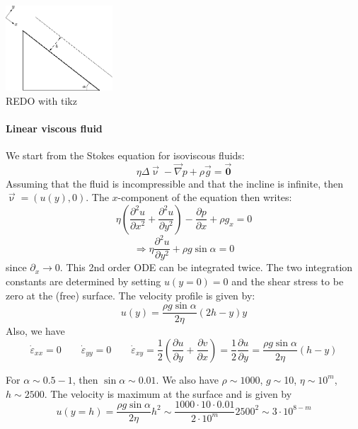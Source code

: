 

\begin{center}
\includegraphics[width=4cm]{python_codes/fieldstone_59/images/setup}\\
{\captionfont REDO with tikz}
\end{center}

\paragraph{Linear viscous fluid}

We start from the Stokes equation for isoviscous fluids:
\[
\eta \Delta \vec{\upnu} - \vec\nabla p + \rho \vec{g} = \vec{\bm 0}
\]
Assuming that the fluid is incompressible and that the incline is infinite, 
then $\vec{\upnu}=(u(y),0)$.
The $x$-component of the equation then writes:
\[
\eta(\frac{\partial^2 u}{\partial x^2}+\frac{\partial^2 u}{\partial y^2} )
- \frac{\partial p}{\partial x} + \rho g_x =0
\]
\[
\Rightarrow 
\eta\frac{\partial^2 u}{\partial y^2} 
+ \rho g \sin\alpha =0
\]
since $\partial_x\rightarrow 0$.
This 2nd order ODE can be integrated twice. The two integration constants are 
determined by setting $u(y=0)=0$ and the shear stress to be zero at the (free)
surface. The velocity profile is given by:
\[
u(y)=\frac{\rho g \sin \alpha}{2 \eta} (2h-y)y
\]
Also, we have 
\[
\dot{\varepsilon}_{xx}=0
\qquad
\dot{\varepsilon}_{yy}=0
\qquad
\dot{\varepsilon}_{xy}
=\frac{1}{2}( \frac{\partial u}{\partial y} + \frac{\partial v}{\partial x} )
=\frac{1}{2} \frac{\partial u}{\partial y} 
= \frac{\rho g \sin \alpha}{2 \eta} (h-y)
\]

For $\alpha\sim 0.5-1$\degree, then $\sin\alpha\sim 0.01$. 
We also have $\rho\sim1000$, $g\sim$10, $\eta\sim 10^m$, $h\sim2500$.
The velocity is maximum at the surface and is given by
\[
u(y=h)=
\frac{\rho g \sin \alpha}{2 \eta}h^2 
\sim \frac{1000 \cdot 10 \cdot 0.01}{ 2\cdot 10^m}2500^2
\sim 3\cdot 10^{8-m}
\]



